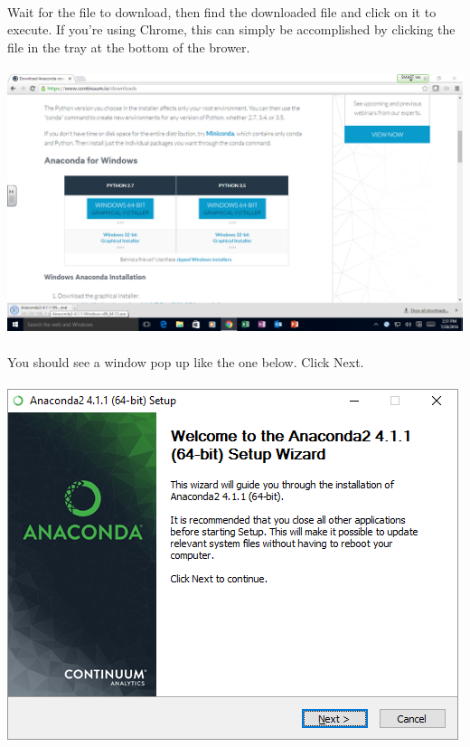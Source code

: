 \documentclass[]{article}
\begin{document}
\paragraph{}
Wait for the file to download, then find the downloaded file and click on it to execute. If you're using Chrome, this can simply be accomplished by clicking the file in the tray at the bottom of the brower.
\paragraph{}
\begin{centering}
    \centerline{\includegraphics[scale=0.35]{Screenshot_4.png}}
\end{centering}

\paragraph{}
You should see a window pop up like the one below. Click Next.
\paragraph{}
\begin{centering}
    \centerline{\includegraphics[scale=0.7]{Screenshot_5.png}}
\end{centering}
\end{document}
